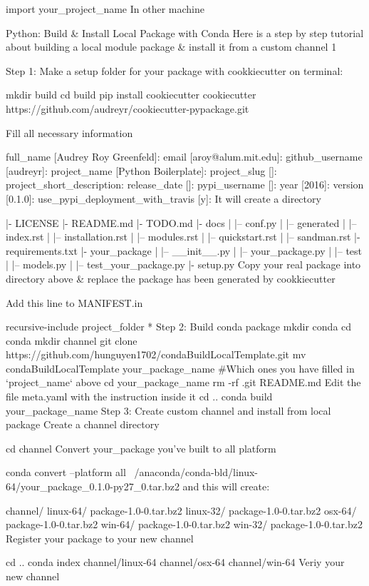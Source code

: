 import your_project_name
In other machine

Python: Build & Install Local Package with Conda
Here is a step by step tutorial about building a local module package & install it from a custom channel 1

Step 1: Make a setup folder for your package with cookkiecutter
on terminal:


mkdir build
cd build
pip install cookiecutter
cookiecutter https://github.com/audreyr/cookiecutter-pypackage.git

Fill all necessary information

full_name [Audrey Roy Greenfeld]:
email [aroy@alum.mit.edu]:
github_username [audreyr]:
project_name [Python Boilerplate]:
project_slug []:
project_short_description:
release_date []:
pypi_username []:
year [2016]:
version [0.1.0]:
use_pypi_deployment_with_travis [y]:
It will create a directory

|- LICENSE
|- README.md
|- TODO.md
|- docs
|   |-- conf.py
|   |-- generated
|   |-- index.rst
|   |-- installation.rst
|   |-- modules.rst
|   |-- quickstart.rst
|   |-- sandman.rst
|- requirements.txt
|- your_package
|   |-- __init__.py
|   |-- your_package.py
|   |-- test
|       |-- models.py
|       |-- test_your_package.py
|- setup.py
Copy your real package into directory above & replace the package has been generated by cookkiecutter

Add this line to MANIFEST.in

recursive-include project_folder *
Step 2: Build conda package
mkdir conda
cd conda
mkdir channel
git clone https://github.com/hunguyen1702/condaBuildLocalTemplate.git
mv condaBuildLocalTemplate your_package_name #Which ones you have filled in `project_name` above
cd your_package_name
rm -rf .git README.md
Edit the file meta.yaml with the instruction inside it
cd ..
conda build your_package_name
Step 3: Create custom channel and install from local package
Create a channel directory

cd channel
Convert your_package you've built to all platform

conda convert --platform all ~/anaconda/conda-bld/linux-64/your_package_0.1.0-py27_0.tar.bz2
and this will create:

channel/
linux-64/
   package-1.0-0.tar.bz2
linux-32/
   package-1.0-0.tar.bz2
osx-64/
   package-1.0-0.tar.bz2
win-64/
   package-1.0-0.tar.bz2
win-32/
   package-1.0-0.tar.bz2
Register your package to your new channel

cd ..
conda index channel/linux-64 channel/osx-64 channel/win-64
Veriy your new channel


